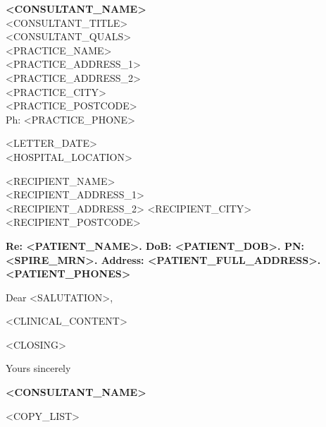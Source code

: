 \documentclass[a4paper,11pt]{article}
\begin{document}
\begin{center}
    \textbf{<CONSULTANT_NAME>}\\
    <CONSULTANT_TITLE>\\
    <CONSULTANT_QUALS>\\
    \vspace{3mm}
    <PRACTICE_NAME>\\
    <PRACTICE_ADDRESS_1>\\
    <PRACTICE_ADDRESS_2>\\
    <PRACTICE_CITY>\\
    <PRACTICE_POSTCODE>\\
    \vspace{2mm}
    Ph: <PRACTICE_PHONE>\\
\end{center}

\vspace{5mm}

\noindent
<LETTER_DATE>\\
<HOSPITAL_LOCATION>

\vspace{8mm}

\noindent
\vspace*{20mm} %
\begin{flushleft}
<RECIPIENT_NAME>\\
<RECIPIENT_ADDRESS_1>\\
<RECIPIENT_ADDRESS_2>
<RECIPIENT_CITY>\\
<RECIPIENT_POSTCODE>
\end{flushleft}

\vspace{10mm}

\noindent
\textbf{Re: <PATIENT_NAME>. DoB: <PATIENT_DOB>. PN: <SPIRE_MRN>. Address: <PATIENT_FULL_ADDRESS>. <PATIENT_PHONES>}

\vspace{8mm}

\noindent
Dear <SALUTATION>,

\vspace{5mm}

\noindent
<CLINICAL_CONTENT>

\vspace{10mm}

\noindent
<CLOSING>

\vspace{3mm}

\noindent
Yours sincerely

\vspace{15mm}

\noindent
\textbf{<CONSULTANT_NAME>}

\vspace{8mm}

<COPY_LIST>
\end{document}
